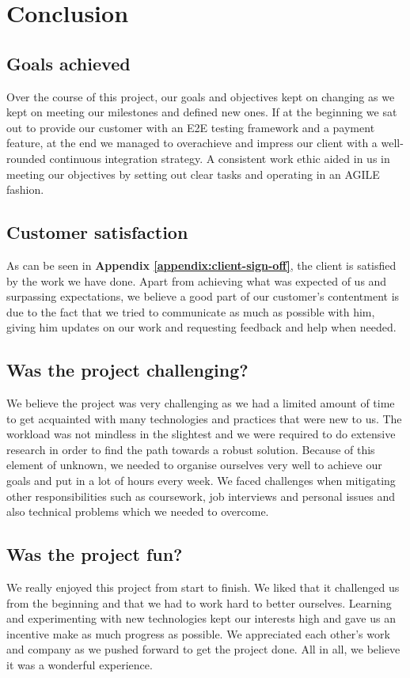 \chapter{Conclusion}
\label{chap:conclusion}

\section{Goals achieved}
\label{sec:goals-achieved}
Over the course of this project, our goals and objectives kept on changing as we kept on meeting our milestones and defined new ones. If at the beginning we sat out to provide our customer with an E2E testing framework and a payment feature, at the end we managed to overachieve and impress our client with a well-rounded continuous integration strategy. A consistent work ethic aided in us in meeting our objectives by setting out clear tasks and operating in an AGILE fashion.

\section{Customer satisfaction}
\label{sec:customer-sastisfaction}
As can be seen in \textbf{Appendix \ref{appendix:client-sign-off}}, the client is satisfied by the work we have done. Apart from achieving what was expected of us and surpassing expectations, we believe a good part of our customer's contentment is due to the fact that we tried to communicate as much as possible with him, giving him updates on our work and requesting feedback and help when needed.

\section{Was the project challenging?}
\label{sec:was-the-project-challenging}
We believe the project was very challenging as we had a limited amount of time to get acquainted with many technologies and practices that were new to us. The workload was not mindless in the slightest and we were required to do extensive research in order to find the path towards a robust solution. Because of this element of unknown, we needed to organise ourselves very well to achieve our goals and put in a lot of hours every week. We faced challenges when mitigating other responsibilities such as coursework, job interviews and personal issues and also technical problems which we needed to overcome.

\section{Was the project fun?}
\label{sec:was-the-project-fun}
We really enjoyed this project from start to finish. We liked that it challenged us from the beginning and that we had to work hard to better ourselves. Learning and experimenting with new technologies kept our interests high and gave us an incentive make as much progress as possible. We appreciated each other's work and company as we pushed forward to get the project done. All in all, we believe it was a wonderful experience.

